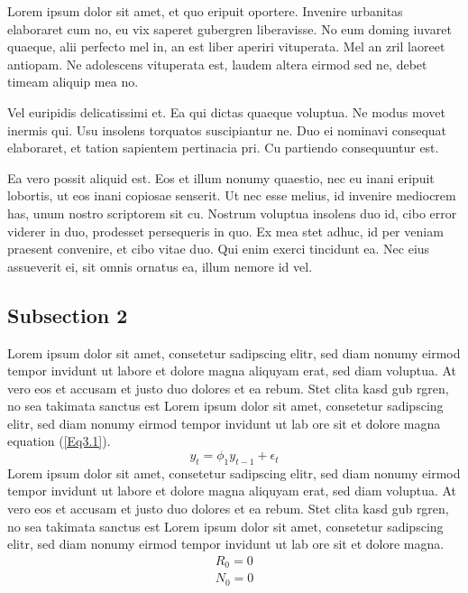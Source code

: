 Lorem ipsum dolor sit amet, et quo eripuit oportere. Invenire urbanitas elaboraret cum no, eu vix saperet gubergren liberavisse. No eum doming iuvaret quaeque, alii perfecto mel in, an est liber aperiri vituperata. Mel an zril laoreet antiopam. Ne adolescens vituperata est, laudem altera eirmod sed ne, debet timeam aliquip mea no.

Vel euripidis delicatissimi et. Ea qui dictas quaeque voluptua. Ne modus movet inermis qui. Usu insolens torquatos suscipiantur ne. Duo ei nominavi consequat elaboraret, et tation sapientem pertinacia pri. Cu partiendo consequuntur est.

Ea vero possit aliquid est. Eos et illum nonumy quaestio, nec eu inani eripuit lobortis, ut eos inani copiosae senserit. Ut nec esse melius, id invenire mediocrem has, unum nostro scriptorem sit cu. Nostrum voluptua insolens duo id, cibo error viderer in duo, prodesset persequeris in quo. Ex mea stet adhuc, id per veniam praesent convenire, et cibo vitae duo. Qui enim exerci tincidunt ea. Nec eius assueverit ei, sit omnis ornatus ea, illum nemore id vel.

\subsection{Subsection 2}

Lorem ipsum dolor sit amet, consetetur sadipscing elitr, sed diam nonumy eirmod tempor invidunt ut labore et dolore magna aliquyam erat, sed diam voluptua. At vero eos et accusam et justo duo dolores et ea rebum. Stet clita kasd gub rgren, no sea takimata sanctus est  Lorem ipsum dolor sit amet, consetetur sadipscing elitr, sed diam nonumy eirmod tempor invidunt ut lab  ore sit et dolore magna equation (\ref{Eq3.1}).
\begin{equation}
y_{t} = \phi_{1} y_{t-1} + \epsilon_{t}
\label{Eq3.1}
\end{equation}
Lorem ipsum dolor sit amet, consetetur sadipscing elitr, sed diam nonumy eirmod tempor invidunt ut labore et dolore magna aliquyam erat, sed diam voluptua. At vero eos et accusam et justo duo dolores et ea rebum. Stet clita kasd gub rgren, no sea takimata sanctus est Lorem ipsum dolor sit amet, consetetur sadipscing elitr, sed diam nonumy eirmod tempor invidunt ut lab ore sit et dolore magna.
\vskip -24pt
\begin{subequations}
	\begin{gather}
	R_0 = 0 \label{Eq3.2a}\\
	N_0 = 0 \label{Eq3.2b}
	\end{gather}
	\label{Eq3.2ab}
\end{subequations}
\vskip -24pt


